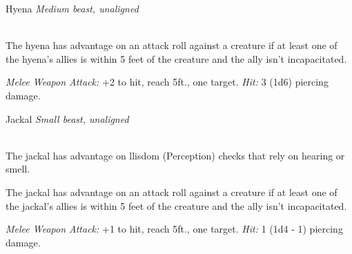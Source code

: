 \documentclass[10pt,twoside,twocolumn,openany]{book}
\begin{document}
\begin{monsterboxnobg}{Hyena}
	\textit{Medium beast, unaligned}\\
	\hline
	\basics[
		armorclass	= 11,
		hitpoints 		= 5 (1d8 + 1),
		speed		= {50 ft.}
	]
	\hline
	\stats[
		STR	= \stat{11},
		DEX	= \stat{13},
		CON	= \stat{12},
		INT	= \stat{2},
		WIS	= \stat{12},
		CHA	= \stat{5}
	]
	\hline
	\details[
		skills			= {Perception +3},
		senses		= {passive Perception 13},
		languages		= {-},
		challenge		= 0
	]
	\hline \\[1mm]
	\begin{monsteraction}
		The hyena has advantage on an attack roll against a creature if at least one of the hyena's allies is within 5 feet of the creature and the ally isn't incapacitated.
	\end{monsteraction}
	\begin{monsteraction}[Bite]
		\textit{Melee Weapon Attack:} +2 to hit, reach 5ft., one target. \textit{Hit:} 3 (1d6) piercing damage.
	\end{monsteraction}
\end{monsterboxnobg}

\begin{monsterboxnobg}{Jackal}
	\textit{Small beast, unaligned}\\
	\hline
	\basics[
		armorclass	= 12,
		hitpoints 		= 3 (1d6),
		speed		= {40 ft.}
	]
	\hline
	\stats[
		STR	= \stat{8},
		DEX	= \stat{15},
		CON	= \stat{11},
		INT	= \stat{3},
		WIS	= \stat{12},
		CHA	= \stat{6}
	]
	\hline
	\details[
		skills			= {Perception +3},
		senses		= {passive Perception 13},
		languages		= {-},
		challenge		= 0
	]
	\hline \\[1mm]
	\begin{monsteraction}
		The jackal has advantage on llisdom (Perception) checks that rely on hearing or smell.
	\end{monsteraction}
	
	\begin{monsteraction}
		The jackal has advantage on an attack roll against a creature if at least one of the jackal's allies is within 5 feet of the creature and the ally isn't incapacitated.
	\end{monsteraction}
	\begin{monsteraction}[Bite]
		\textit{Melee Weapon Attack:} +1 to hit, reach 5ft., one target. \textit{Hit:} 1 (1d4 - 1) piercing damage.
	\end{monsteraction}
\end{monsterboxnobg}
\end{document}
